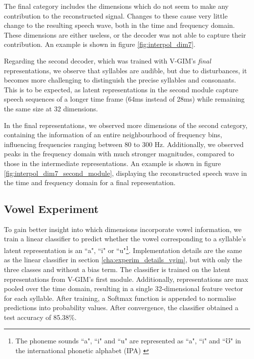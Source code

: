 		The final category includes the dimensions which do not seem to make any contribution to the reconstructed signal. Changes to these cause very little change to the resulting speech wave, both in the time and frequency domain. These dimensions are either useless, or the decoder was not able to capture their contribution. An example is shown in figure \ref{fig:interpol_dim7}.
		
		Regarding the second decoder, which was trained with V-GIM's \textit{final} representations, we observe that syllables are audible, but due to disturbances, it becomes more challenging to distinguish the precise syllables and consonants. This is to be expected, as latent representations in the second module capture speech sequences of a longer time frame (64ms instead of 28ms) while remaining the same size at 32 dimensions.
		
		In the final representations, we observed more dimensions of the second category, containing the information of an entire neighbourhood of frequency bins, influencing frequencies ranging between 80 to 300 Hz. Additionally, we observed peaks in the frequency domain with much stronger magnitudes, compared to those in the intermediate representations. An example is shown in figure \ref{fig:interpol_dim7_second_module}, displaying the reconstructed speech wave in the time and frequency domain for a final representation.
		
		
	
	\subsection{Vowel Experiment}
		To gain better insight into which dimensions incorporate vowel information, we train a linear classifier to predict whether the vowel corresponding to a syllable's latent representation is an ``a", ``i" or  ``u"\footnote{The phoneme sounds ``a", ``i" and ``u" are represented as ``a", ``i" and ``$\mho$" in the international phonetic alphabet (IPA) \citep{teachwonderfulLetExploreInternational2021}}. Implementation details are the same as the linear classifier in section \ref{cha:experim_details_vgim}, but with only the three classes and without a bias term. The classifier is trained on the latent representations from V-GIM's first module. Additionally, representations are max pooled over the time domain, resulting in a single 32-dimensional feature vector for each syllable. After training, a Softmax function is appended to normalise predictions into probability values. After convergence, the classifier obtained a test accuracy of 85.38\%.
		
